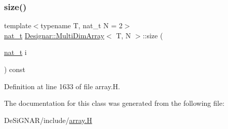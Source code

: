 \subsubsection{\texorpdfstring{size()}{size()}}
{\footnotesize\ttfamily template$<$typename T, nat\+\_\+t N = 2$>$ \\
\hyperlink{namespace_designar_aa72662848b9f4815e7bf31a7cf3e33d1}{nat\+\_\+t} \hyperlink{class_designar_1_1_multi_dim_array}{Designar\+::\+Multi\+Dim\+Array}$<$ T, N $>$\+::size (\begin{DoxyParamCaption}\item[{\hyperlink{namespace_designar_aa72662848b9f4815e7bf31a7cf3e33d1}{nat\+\_\+t}}]{i }\end{DoxyParamCaption}) const\hspace{0.3cm}{\ttfamily [inline]}}



Definition at line 1633 of file array.\+H.



The documentation for this class was generated from the following file\+:\begin{DoxyCompactItemize}
\item 
De\+Si\+G\+N\+A\+R/include/\hyperlink{array_8_h}{array.\+H}\end{DoxyCompactItemize}
